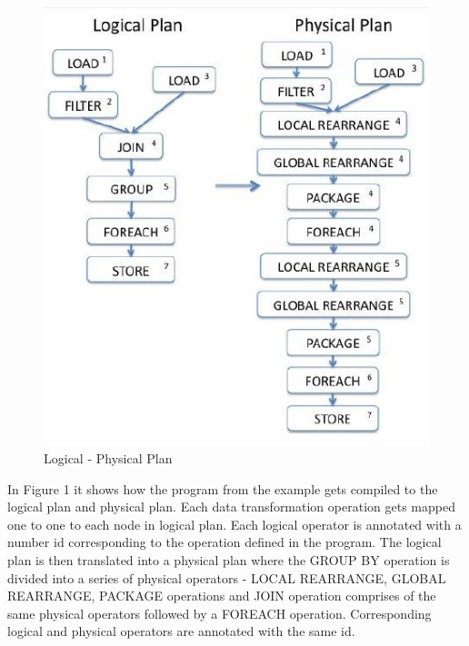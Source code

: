 \begin{figure}
\begin{center}
\includegraphics[scale=0.5]{Images/LogicalPhysicalPlan.JPG} 
\end{center}
\caption{Logical - Physical Plan\cite{gates2009building}}
\end{figure}
In Figure 1 it shows how the program from the example gets compiled to the logical plan and physical plan. Each data transformation operation gets mapped one to one to each node in logical plan. Each logical operator is annotated with a number id corresponding to the operation defined in the program. The logical plan is then translated into a physical plan where the GROUP BY operation is divided into a series of physical operators - LOCAL REARRANGE, GLOBAL REARRANGE, PACKAGE operations and JOIN operation comprises of the same physical operators followed by a FOREACH operation. Corresponding logical and physical operators are annotated with the same id.
